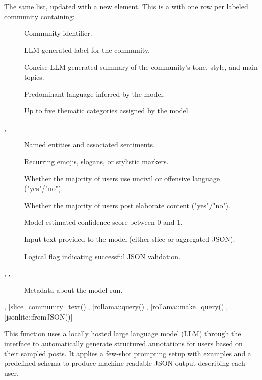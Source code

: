 \documentclass[a4paper]{book}
\begin{document}
\begin{Value}
The same  list, updated with a new  element.
This is a  with one row per labeled community containing:
\begin{description}

\item[] Community identifier.
\item[] LLM-generated label for the community.
\item[] Concise LLM-generated summary of the community's tone, style, and main topics.
\item[] Predominant language inferred by the model.
\item[] Up to five thematic categories assigned by the model.
\item[, ] Named entities and associated sentiments.
\item[] Recurring emojis, slogans, or stylistic markers.
\item[] Whether the majority of users use uncivil or offensive language ("yes"/"no").
\item[] Whether the majority of users post elaborate content ("yes"/"no").
\item[] Model-estimated confidence score between 0 and 1.
\item[] Input text provided to the model (either slice or aggregated JSON).
\item[] Logical flag indicating successful JSON validation.
\item[, , ] Metadata about the model run.

\end{description}

\end{Value}
%
\begin{SeeAlso}
, [slice\_community\_text()], [rollama::query()], [rollama::make\_query()], [jsonlite::fromJSON()]
\end{SeeAlso}
%
\begin{Description}
This function uses a locally hosted large language model (LLM) through the 
 interface to automatically generate structured annotations for users 
based on their sampled posts. It applies a few-shot prompting setup with examples 
and a predefined schema to produce machine-readable JSON output describing each user.
\end{Description}
\end{document}
